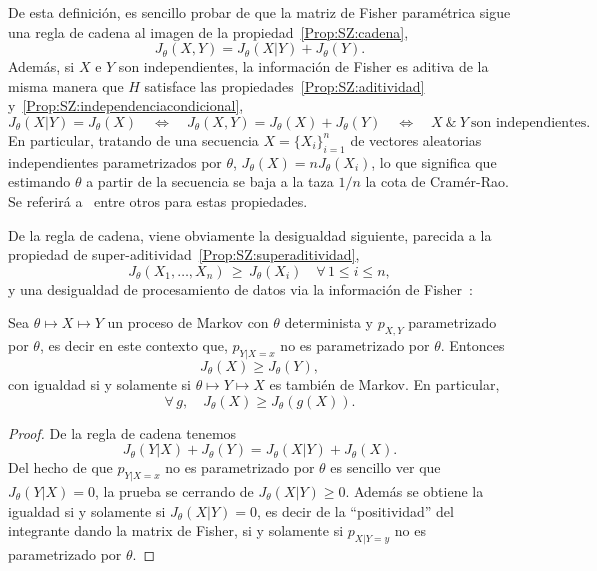De  esta  definici\'on,   es  sencillo  probar  de  que   la  matriz  de  Fisher
param\'etrica    sigue    una   regla    de    cadena    al    imagen   de    la
propiedad~\ref{Prop:SZ:cadena},
%
\[
J_\theta(X,Y) = J_\theta(X|Y) + J_\theta(Y).
\]
%
Adem\'as, si $X$ e $Y$ son independientes, la informaci\'on de Fisher es aditiva
de la  misma manera  que $H$ satisface  las propiedades~\ref{Prop:SZ:aditividad}
y~\ref{Prop:SZ:independenciacondicional}, \ie
%
\[
J_\theta(X|Y)  = J_\theta(X)  \quad \Leftrightarrow  \quad J_\theta(X,Y)  =  J_\theta(X) +
J_\theta(Y)   \quad  \Leftrightarrow   \quad  X   \:  \&   \:  Y   \:  \mbox{son
  independientes.}
\]
%
En particular,  tratando de una  secuencia $X =  \{ X_i \}_{i=1}^n$  de vectores
aleatorias  independientes   parametrizados  por  $\theta$,   $J_\theta(X)  =  n
J_\theta(X_i)$, lo que significa que estimando $\theta$ a partir de la secuencia
se   baja  a   la  taza   $1/n$  la   cota  de   Cram\'er-Rao.    Se  referir\'a
a~\cite{Fis25:07, Sta59,  Kay93, KagSmi99,  Joh04, CovTho06, Rio07}  entre otros
para estas propiedades.

De la regla de cadena, viene  obviamente la desigualdad siguiente, parecida a la
propiedad de super-aditividad~\ref{Prop:SZ:superaditividad},
%
\[
J_\theta(X_1,\ldots,X_n) \, \ge \,  J_\theta(X_i) \quad \forall \, 1 \le i \le n,
\]
%
y  una   desigualdad  de  procesamiento   de  datos  via  la   informaci\'on  de
Fisher~\cite{Zam98, Rio07, CovTho06, Fri04, KagSmi99}:
%
\begin{teorema}
  Sea  $\theta  \mapsto  X  \mapsto   Y$  un  proceso  de  Markov  con  $\theta$
  determinista y $p_{X,Y}$ parametrizado por $\theta$, es decir en este contexto
  que, $p_{Y|X=x}$ no es parametrizado por $\theta$. Entonces
  \[
  J_\theta(X) \ge J_\theta(Y),
  \]
  con igualdad si y solamente si $\theta \mapsto Y \mapsto X$ es tambi\'en
  de Markov. En  particular,
  \[
  \forall \, g, \quad J_\theta(X) \ge J_\theta(g(X)).
  \]
\end{teorema}
%
\begin{proof}
  De la regla de cadena tenemos
  \[
  J_\theta(Y|X) + J_\theta(Y) = J_\theta(X|Y) + J_\theta(X).
  \]
  Del hecho de que $p_{Y|X=x}$ no  es parametrizado por $\theta$ es sencillo ver
  que  $J_\theta(Y|X)  =  0$,  la  prueba  se  cerrando  de  $J_\theta(X|Y)  \ge
  0$. Adem\'as se obtiene la igualdad  si y solamente si $J_\theta(X|Y) = 0$, es
  decir de  la ``positividad'' del  integrante dando la  matrix de Fisher,  si y
  solamente si $p_{X|Y=y}$ no es parametrizado por $\theta$.
\end{proof}

